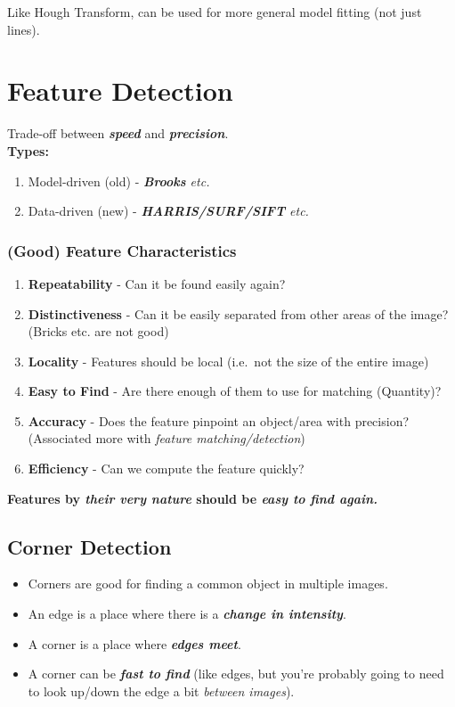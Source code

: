 \documentclass[english, 10pt]{article}
\begin{document}
  Like Hough Transform, can be used for more general model fitting (not
  just lines).


\section{Feature Detection}

Trade-off between \emph{\textbf{speed}} and \emph{\textbf{precision}}.\\
  
\textbf{Types:} 
  
\begin{enumerate}
 \item Model-driven (old) - \emph{\textbf{Brooks} etc.}
 \item Data-driven (new) - \emph{\textbf{HARRIS/SURF/SIFT }etc.}
\end{enumerate}
 
 \subsubsection{(Good) Feature Characteristics}
 
  \begin{enumerate}
  \item
    \textbf{Repeatability} - Can it be found easily again?
  \item
    \textbf{Distinctiveness} - Can it be easily separated from other
    areas of the image? (Bricks etc. are not good)
  \item
    \textbf{Locality} - Features should be local (i.e.~not the size of
    the entire image)
  \item
    \textbf{Easy to Find} - Are there enough of them to use for matching
    (Quantity)?
  \item
    \textbf{Accuracy} - Does the feature pinpoint an object/area with
    precision? (Associated more with \emph{feature matching/detection})
  \item
    \textbf{Efficiency} - Can we compute the feature quickly?
  \end{enumerate}

\textbf{Features by \textit{their very nature} should be \textit{easy to find again.}}

\subsection{Corner Detection}\label{corner-detection}

\begin{itemize}
\itemsep1pt\parskip0pt
\item
  Corners are good for finding a common object in multiple images.
\item
  An edge is a place where there is a \textbf{\emph{change in
  intensity}}.
\item
  A corner is a place where \textbf{\emph{edges meet}}.
\item
  A corner can be \textbf{\emph{fast to find}} (like edges, but you're
  probably going to need to look up/down the edge a bit \emph{between
  images}).
\end{itemize}
\end{document}

